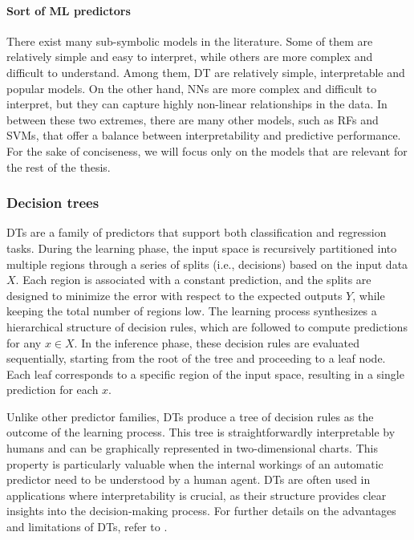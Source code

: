 \paragraph{Sort of \gls{ML} predictors}
%
There exist many sub-symbolic models in the literature.
%
Some of them are relatively simple and easy to interpret, while others are more complex and difficult to understand.
%
Among them, \gls{DT} are relatively simple, interpretable and popular models.
%
On the other hand, \glspl{NN} are more complex and difficult to interpret, but they can capture highly non-linear relationships in the data.
%
In between these two extremes, there are many other models, such as \glspl{RF} and \glspl{SVM}, that offer a balance between interpretability and predictive performance.
%
For the sake of conciseness, we will focus only on the models that are relevant for the rest of the thesis.


\subsubsection{Decision trees}\label{subsubsec:decision-trees}
%
\Glspl{DT} are a family of predictors that support both classification and regression tasks.
%
During the learning phase, the input space is recursively partitioned into multiple regions through a series of splits (i.e., decisions) based on the input data \(X\).
%
Each region is associated with a constant prediction, and the splits are designed to minimize the error with respect to the expected outputs \(Y\), while keeping the total number of regions low.
%
The learning process synthesizes a hierarchical structure of decision rules, which are followed to compute predictions for any \(x \in X\).
%
In the inference phase, these decision rules are evaluated sequentially, starting from the root of the tree and proceeding to a leaf node.
%
Each leaf corresponds to a specific region of the input space, resulting in a single prediction for each \(x\).

Unlike other predictor families, \glspl{DT} produce a tree of decision rules as the outcome of the learning process.
%
This tree is straightforwardly interpretable by humans and can be graphically represented in two-dimensional charts.
%
This property is particularly valuable when the internal workings of an automatic predictor need to be understood by a human agent.
%
\Glspl{DT} are often used in applications where interpretability is crucial, as their structure provides clear insights into the decision-making process.
%
For further details on the advantages and limitations of \glspl{DT}, refer to .


